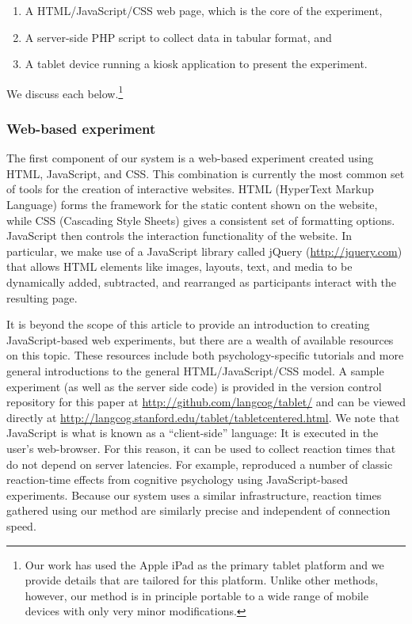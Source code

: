 \documentclass[man,noapacite]{apa2}
\begin{document}
\begin{enumerate}
\item A HTML/JavaScript/CSS web page, which is the core of the experiment, 
\item A server-side PHP script to collect data in tabular format, and
\item A tablet device running a kiosk application to present the experiment. 
\end{enumerate}

\noindent We discuss each below.\footnote{Our work has used the Apple iPad as the primary tablet platform and we provide details that are tailored for this platform. Unlike other methods, however, our method is in principle portable to a wide range of mobile devices with only very minor modifications.}

\subsubsection{Web-based experiment}

The first component of our system is a web-based experiment created using HTML, JavaScript, and CSS. This combination is currently the most common set of tools for the creation of interactive websites. HTML (HyperText Markup Language) forms the framework for the static content shown on the website, while CSS (Cascading Style Sheets) gives a consistent set of formatting options. JavaScript then controls the interaction functionality of the website. In particular, we make use of a JavaScript library called jQuery (\url{http://jquery.com}) that allows HTML elements like images, layouts, text, and media to be dynamically added, subtracted, and rearranged as participants interact with the resulting page. 

It is beyond the scope of this article to provide an introduction to creating JavaScript-based web experiments, but there are a wealth of available resources on this topic. These resources include both psychology-specific tutorials and more general introductions to the general HTML/JavaScript/CSS model. A sample experiment (as well as the server side code) is provided in the version control repository for this paper  at \url{http://github.com/langcog/tablet/} and can be viewed directly at \url{http://langcog.stanford.edu/tablet/tabletcentered.html}. We note that JavaScript is what is known as a ``client-side'' language: It is executed in the user's web-browser. For this reason, it can be used to collect reaction times that do not depend on server latencies. For example,  reproduced a number of classic reaction-time effects from cognitive psychology using JavaScript-based experiments. Because our system uses a similar infrastructure, reaction times gathered using our method are similarly precise and independent of connection speed. 
\end{document}
